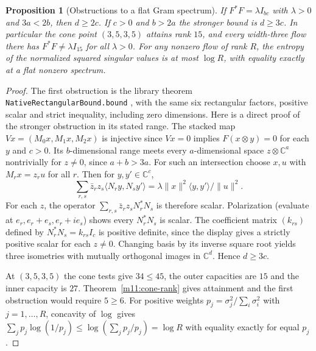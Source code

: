 \documentclass[11pt,reqno]{amsart}
\newtheorem{proposition}[theorem]{Proposition}
\theoremstyle{definition}
\theoremstyle{remark}
\numberwithin{equation}{section}
\begin{document}
\begin{proposition}[Obstructions to a flat Gram spectrum]\label{m11:flat-obstruction}
If $F^*F=\lambda I_{bc}$ with $\lambda>0$ and $3a<2b$, then
$d\ge2c$. If $c>0$ and $b>2a$ the stronger bound is $d\ge3c$.
In particular the cone point $(3,5,3,5)$ attains rank $15$, and
every width-three flow there has $F^*F\ne\lambda I_{15}$ for
all $\lambda>0$. For any nonzero flow of rank $R$, the entropy
of the normalized squared singular values is at most $\log R$,
with equality exactly at a flat nonzero spectrum.
\end{proposition}
\begin{proof}
The first obstruction is the library theorem
\texttt{NativeRectangularBound.bound} \cite{Tru}, with the same six
rectangular factors, positive scalar and strict inequality, including
zero dimensions. Here is a direct proof of
the stronger obstruction in its stated range. The stacked map
$Vx=(M_0x,M_1x,M_2x)$ is injective since $Vx=0$ implies
$F(x\otimes y)=0$ for each $y$ and $c>0$. Its $b$-dimensional
range meets every $a$-dimensional space $z\otimes\mathbb C^a$
nontrivially for $z\ne0$, since $a+b>3a$.
For such an intersection choose $x,u$ with $M_rx=z_ru$
for all $r$. Then for $y,y'\in\mathbb C^c$,
\[
 \sum_{r,s}\bar z_rz_s\langle N_r y,N_s y'\rangle
 =\lambda\|x\|^2\langle y,y'\rangle/\|u\|^2 .
\]
For each $z$, the operator $\sum_{r,s}\bar z_rz_s N_r^*N_s$ is
therefore scalar. Polarization (evaluate at $e_r,e_r+e_s,e_r+i e_s$)
shows every $N_r^*N_s$ is scalar. The coefficient matrix $(k_{rs})$
defined by $N_r^*N_s=k_{rs}I_c$ is positive definite, since the
display gives a strictly positive scalar for each $z\ne0$.
Changing basis by its inverse square root yields three isometries
with mutually orthogonal images in $\mathbb C^d$. Hence $d\ge3c$.

At $(3,5,3,5)$ the cone tests give $34\le45$, the outer
capacities are $15$ and the inner capacity is $27$.
Theorem~\ref{m11:cone-rank} gives attainment and the first
obstruction would require $5\ge6$. For positive weights
$p_j=\sigma_j^2/\sum_i\sigma_i^2$ with $j=1,\ldots,R$,
concavity of $\log$ gives
$\sum_j p_j\log(1/p_j)\le\log(\sum_j p_j/p_j)=\log R$
with equality exactly for equal $p_j$.
\end{proof}
\end{document}
